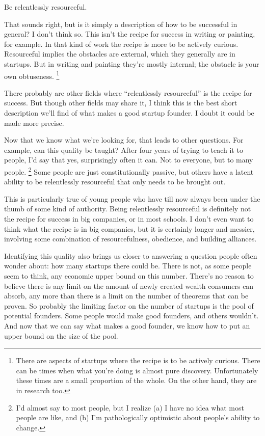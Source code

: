 Be relentlessly resourceful.

That sounds right, but is it simply a description of how to be
successful in general? I don't think so. This isn't the recipe for
success in writing or painting, for example. In that kind of work the
recipe is more to be actively curious. Resourceful implies the obstacles
are external, which they generally are in startups. But in writing and
painting they're mostly internal; the obstacle is your own obtuseness.
\footnote{There are aspects of startups where the recipe is to be actively
curious. There can be times when what you're doing is almost pure
discovery. Unfortunately these times are a small proportion of the
whole. On the other hand, they are in research too.}

There probably are other fields where ``relentlessly resourceful'' is
the recipe for success. But though other fields may share it, I think
this is the best short description we'll find of what makes a good
startup founder. I doubt it could be made more precise.

Now that we know what we're looking for, that leads to other questions.
For example, can this quality be taught? After four years of trying to
teach it to people, I'd say that yes, surprisingly often it can. Not to
everyone, but to many people. \footnote{I'd almost say to most people, but I realize (a) I have no idea
what most people are like, and (b) I'm pathologically optimistic about
people's ability to change.} Some people are
just constitutionally passive, but others have a latent ability to be
relentlessly resourceful that only needs to be brought out.

This is particularly true of young people who have till now always been
under the thumb of some kind of authority. Being relentlessly
resourceful is definitely not the recipe for success in big companies,
or in most schools. I don't even want to think what the recipe is in big
companies, but it is certainly longer and messier, involving some
combination of resourcefulness, obedience, and building alliances.

Identifying this quality also brings us closer to answering a question
people often wonder about: how many startups there could be. There is
not, as some people seem to think, any economic upper bound on this
number. There's no reason to believe there is any limit on the amount of
newly created wealth consumers can absorb, any more than there is a
limit on the number of theorems that can be proven. So probably the
limiting factor on the number of startups is the pool of potential
founders. Some people would make good founders, and others wouldn't. And
now that we can say what makes a good founder, we know how to put an
upper bound on the size of the pool.

